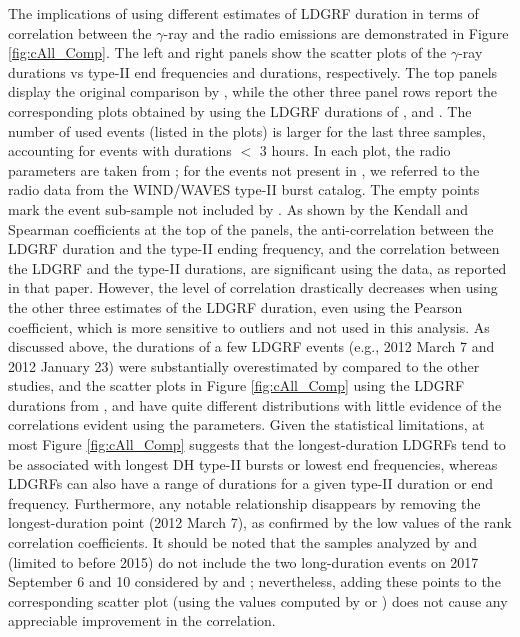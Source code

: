 \documentclass{aastex61}
\begin{document}
The implications of using different estimates of LDGRF duration in terms of correlation between the $\gamma$-ray and the radio emissions are demonstrated in Figure \ref{fig:cAll_Comp}. The left and right panels show the scatter plots of the $\gamma$-ray durations vs type-II end frequencies and durations, respectively.
The top panels display the original comparison by \citet{ref:GOPALSWAMY2019b}, while the other three panel rows report the corresponding plots obtained by using the LDGRF durations of \citet{ref:SHARE2018}, \citet{ref:WINTER2018} and \citet{ref:AJELLO2021}. The number of used events (listed in the plots) is larger for the last three samples, accounting for events with durations $<$ 3 hours. In each plot, the radio parameters are taken from \citet{ref:GOPALSWAMY2019b}; for the events not present in \citet{ref:GOPALSWAMY2019b}, we referred to the radio data from the WIND/WAVES type-II burst catalog.
The empty points mark the event sub-sample not included by \citet{ref:GOPALSWAMY2019b}.
As shown by the Kendall and Spearman coefficients at the top of the panels,
the anti-correlation between the LDGRF duration and the type-II ending frequency, and the correlation between the LDGRF and the type-II durations, are significant using the \citet{ref:GOPALSWAMY2019b} data, as reported in that paper. 
However, the level of correlation drastically decreases 
when using the other three estimates of the LDGRF duration, even
using the Pearson coefficient, which is more sensitive to outliers and not used in this analysis.
As discussed above, the durations of a few LDGRF events (e.g., 2012 March 7 and 2012 January 23) were substantially overestimated by \citet{ref:GOPALSWAMY2019b} 
compared to the other studies, and the scatter plots in Figure \ref{fig:cAll_Comp} using the LDGRF durations from \citet{ref:SHARE2018}, \citet{ref:WINTER2018} and \citet{ref:AJELLO2021} have quite different distributions with little evidence of the correlations evident using the \citet{ref:GOPALSWAMY2019b} parameters.
Given the statistical limitations, at most Figure \ref{fig:cAll_Comp} suggests that the longest-duration LDGRFs tend to be associated with longest DH type-II bursts or lowest end frequencies, 
whereas LDGRFs can also have a range of durations for a given type-II duration or end frequency.  
Furthermore, any notable relationship disappears by removing the longest-duration point (2012 March 7), as confirmed by the low values of the rank correlation coefficients. 
It should be noted that the samples analyzed by \citet{ref:SHARE2018} and \citet{ref:WINTER2018} (limited to before 2015) do not include the two long-duration events on 2017 September 6 and 10 considered by \citet{ref:GOPALSWAMY2019b} and \citet{ref:AJELLO2021}; nevertheless, adding these points to the corresponding scatter plot (using the values computed by \citet{ref:GOPALSWAMY2019b} or \citet{ref:AJELLO2021}) does not cause any appreciable improvement in the correlation.
\end{document}
